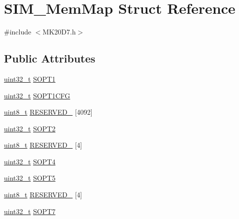 \hypertarget{struct_s_i_m___mem_map}{}\section{S\+I\+M\+\_\+\+Mem\+Map Struct Reference}
\label{struct_s_i_m___mem_map}


{\ttfamily \#include $<$M\+K20\+D7.\+h$>$}

\subsection*{Public Attributes}
\begin{DoxyCompactItemize}
\item 
\hyperlink{_p_e___types_8h_a33594304e786b158f3fb30289278f5af}{uint32\+\_\+t} \hyperlink{struct_s_i_m___mem_map_a1152a6ef88c78e762df97badf10b5050}{S\+O\+P\+T1}
\item 
\hyperlink{_p_e___types_8h_a33594304e786b158f3fb30289278f5af}{uint32\+\_\+t} \hyperlink{struct_s_i_m___mem_map_a9b6ea6819e80eeaa90754b6e91fcc808}{S\+O\+P\+T1\+C\+FG}
\item 
\hyperlink{_p_e___types_8h_aba7bc1797add20fe3efdf37ced1182c5}{uint8\+\_\+t} \hyperlink{struct_s_i_m___mem_map_aa6f075e48cb371e0e12143af9570b4f4}{R\+E\+S\+E\+R\+V\+E\+D\+\_} \mbox{[}4092\mbox{]}
\item 
\hyperlink{_p_e___types_8h_a33594304e786b158f3fb30289278f5af}{uint32\+\_\+t} \hyperlink{struct_s_i_m___mem_map_ae4c4bf827aeca9c2de082cdfafdea3d1}{S\+O\+P\+T2}
\item 
\hyperlink{_p_e___types_8h_aba7bc1797add20fe3efdf37ced1182c5}{uint8\+\_\+t} \hyperlink{struct_s_i_m___mem_map_adba6606eff204f543702e9113e20e543}{R\+E\+S\+E\+R\+V\+E\+D\+\_} \mbox{[}4\mbox{]}
\item 
\hyperlink{_p_e___types_8h_a33594304e786b158f3fb30289278f5af}{uint32\+\_\+t} \hyperlink{struct_s_i_m___mem_map_adf28cda65cea7072379ec6064d0d93cc}{S\+O\+P\+T4}
\item 
\hyperlink{_p_e___types_8h_a33594304e786b158f3fb30289278f5af}{uint32\+\_\+t} \hyperlink{struct_s_i_m___mem_map_a19e2ddf391b1d9c03240be8267fdf781}{S\+O\+P\+T5}
\item 
\hyperlink{_p_e___types_8h_aba7bc1797add20fe3efdf37ced1182c5}{uint8\+\_\+t} \hyperlink{struct_s_i_m___mem_map_a475ea9561d65aeb7e335e5fb4fa0bb7b}{R\+E\+S\+E\+R\+V\+E\+D\+\_} \mbox{[}4\mbox{]}
\item 
\hyperlink{_p_e___types_8h_a33594304e786b158f3fb30289278f5af}{uint32\+\_\+t} \hyperlink{struct_s_i_m___mem_map_a04a22056fd7d08179705d29cda1b9e2a}{S\+O\+P\+T7}

\end{DoxyCompactItemize}

